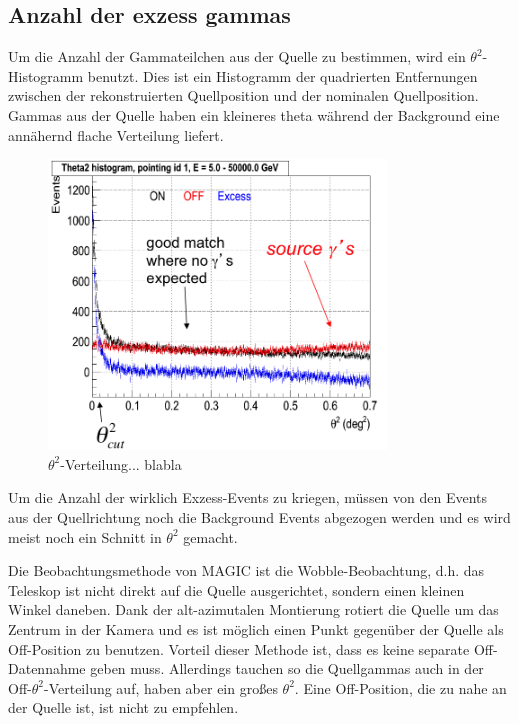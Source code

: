 \subsection{Anzahl der exzess gammas}
Um die Anzahl der Gammateilchen aus der Quelle zu bestimmen, wird ein $\theta^2$-Histogramm benutzt.
Dies ist ein Histogramm der quadrierten Entfernungen zwischen der rekonstruierten Quellposition und der nominalen Quellposition.
Gammas aus der Quelle haben ein kleineres theta während der Background eine annähernd flache Verteilung liefert. 

\begin{figure}
    \centering
    \includegraphics[width=0.8\textwidth]{./Plots/04_MrkAnalyse/Theta2Example.png}
    \caption{$\theta^2$-Verteilung... blabla}
    \label{Disp}
\end{figure}

Um die Anzahl der wirklich Exzess-Events zu kriegen, müssen von den Events aus der Quellrichtung noch die Background Events abgezogen werden und es wird meist noch ein Schnitt in $\theta^2$ gemacht.

Die Beobachtungsmethode von MAGIC ist die Wobble-Beobachtung, d.h. das Teleskop ist nicht direkt auf die Quelle ausgerichtet, sondern einen kleinen Winkel daneben.
Dank der alt-azimutalen Montierung rotiert die Quelle um das Zentrum in der Kamera und es ist möglich einen Punkt gegenüber der Quelle als Off-Position zu benutzen.
Vorteil dieser Methode ist, dass es keine separate Off-Datennahme geben muss.
Allerdings tauchen so die Quellgammas auch in der Off-$\theta^2$-Verteilung auf, haben aber ein großes $\theta^2$.
Eine Off-Position, die zu nahe an der Quelle ist, ist nicht zu empfehlen.

